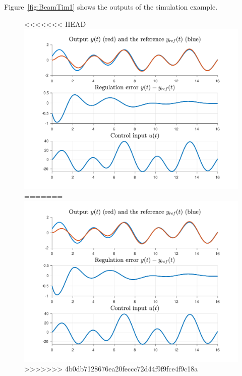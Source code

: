 \documentclass[11pt, a4paper]{amsart}
\theoremstyle{definition}
\numberwithin{equation}{section}
\begin{document}
Figure~\ref{fig:BeamTim1} shows the outputs of the simulation example.

\begin{figure}[h!]
  \begin{minipage}{0.48\linewidth}
    \begin{flushleft}
<<<<<<< HEAD
      \includegraphics[width=\linewidth]{B1outputs.pdf}
=======
      \includegraphics[width=\linewidth]{BTim1outputs.pdf}
>>>>>>> 4b0db7128676ea20feccc72d44f9f9fce4f9c18a
    \end{flushleft}
  \end{minipage}
  \begin{minipage}{0.48\linewidth}
    \begin{flushright}

\end{flushright}
\end{minipage}
\end{figure}
\end{document}
